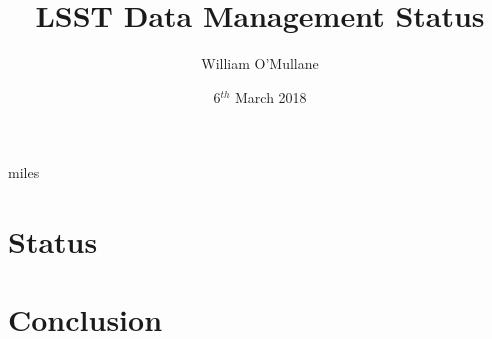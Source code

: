 \documentclass[t,aspectratio=169]{beamer}
\author{William O'Mullane}
\institute{AURA/LSST}
\title{LSST Data Management Status  }
\date{ 6$^{th}$ March 2018}
\begin{document}
\maketitle

 {miles}


\section{Status }








\section{Conclusion}


\appendix

\end{document}

